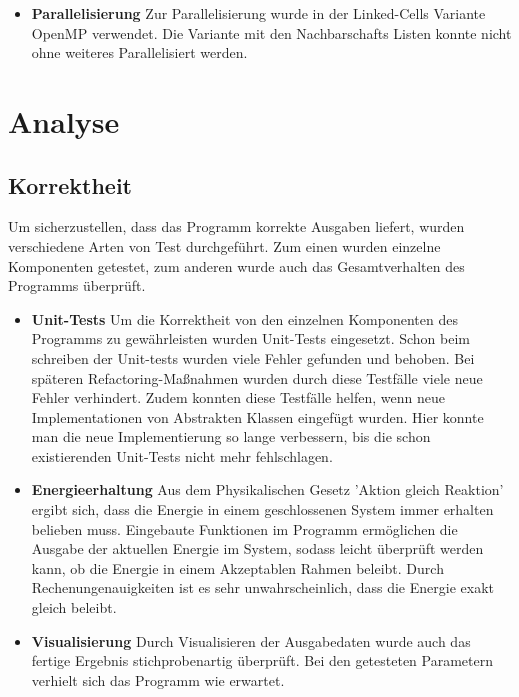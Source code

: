 \documentclass[
	12pt,
	a4paper,
	BCOR10mm,
	DIV14,
	headsepline,
]{scrreprt}
\begin{document}
\begin{itemize}
	\item \textbf{Parallelisierung} Zur Parallelisierung wurde in der Linked-Cells Variante OpenMP verwendet. Die Variante mit den Nachbarschafts Listen konnte nicht ohne weiteres Parallelisiert werden.
\end{itemize}

\section{Analyse}
\subsection{Korrektheit}
Um sicherzustellen, dass das Programm korrekte Ausgaben liefert, wurden verschiedene Arten von Test durchgeführt. Zum einen wurden einzelne Komponenten getestet, zum anderen wurde auch das Gesamtverhalten des Programms überprüft.
\begin{itemize}
	\item \textbf{Unit-Tests} Um die Korrektheit von den einzelnen Komponenten des Programms zu gewährleisten wurden Unit-Tests eingesetzt. Schon beim schreiben der Unit-tests wurden viele Fehler gefunden und behoben. Bei späteren Refactoring-Maßnahmen wurden durch diese Testfälle viele neue Fehler verhindert. Zudem konnten diese Testfälle helfen, wenn neue Implementationen von Abstrakten Klassen eingefügt wurden. Hier konnte man die neue Implementierung so lange verbessern, bis die schon existierenden Unit-Tests nicht mehr fehlschlagen.
	\item \textbf{Energieerhaltung} Aus dem Physikalischen Gesetz 'Aktion gleich Reaktion' ergibt sich, dass die Energie in einem geschlossenen System immer erhalten belieben muss. Eingebaute Funktionen im Programm ermöglichen die Ausgabe der aktuellen Energie im System, sodass leicht überprüft werden kann, ob die Energie in einem Akzeptablen Rahmen beleibt. Durch Rechenungenauigkeiten ist es sehr unwahrscheinlich, dass die Energie exakt gleich beleibt.
	\item \textbf{Visualisierung} Durch Visualisieren der Ausgabedaten wurde auch das fertige Ergebnis stichprobenartig überprüft. Bei den getesteten Parametern verhielt sich das Programm wie erwartet.
\end{itemize}
\end{document}
